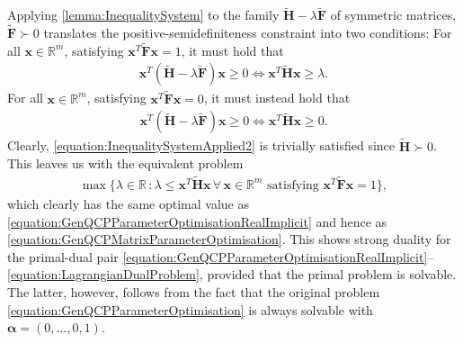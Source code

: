 \documentclass[10pt,conference]{IEEEtran}
\newcommand*{\R}{\mathbb{R}}          %
\newcommand*{\transpose}{T}           %
\begin{document}
Applying \autoref{lemma:InequalitySystem} to the family $\tilde{\bm{H}} - \lambda \tilde{\bm{F}}$ of symmetric matrices, $\tilde{\bm{F}} \succ 0$ translates the positive-semidefiniteness constraint into two conditions:
For all $\bm{x} \in \R^{m}$, satisfying $\bm{x}^{\transpose} \tilde{\bm{F}} \bm{x} = 1$, it must hold that
\begin{align}\label{equation:InequalitySystemApplied1}
    \bm{x}^{\transpose} (\tilde{\bm{H}} - \lambda \tilde{\bm{F}}) \bm{x} \geq 0 \iff \bm{x}^{\transpose} \tilde{\bm{H}} \bm{x} \geq \lambda.
\end{align}
For all $\bm{x} \in \R^{m}$, satisfying $\bm{x}^{\transpose} \tilde{\bm{F}} \bm{x} = 0$, it must instead hold that
\begin{align}\label{equation:InequalitySystemApplied2}
    \bm{x}^{\transpose} (\tilde{\bm{H}} - \lambda \tilde{\bm{F}}) \bm{x} \geq 0 \Leftrightarrow \bm{x}^{\transpose} \tilde{\bm{H}} \bm{x} \geq 0.
\end{align}
Clearly, \eqref{equation:InequalitySystemApplied2} is trivially satisfied since $\tilde{\bm{H}} \succ 0$.
This leaves us with the equivalent problem
\begin{align*}
    \max\{\lambda \in \R\, \colon \lambda \leq \bm{x}^{\transpose} \tilde{\bm{H}} \bm{x}\, \forall\, \bm{x} \in \R^{m} \text{ satisfying } \bm{x}^{\transpose} \tilde{\bm{F}} \bm{x} = 1\},
\end{align*}
which clearly has the same optimal value as \eqref{equation:GenQCPParameterOptimisationRealImplicit} and hence as \eqref{equation:GenQCPMatrixParameterOptimisation}.
This shows strong duality for the primal-dual pair \eqref{equation:GenQCPParameterOptimisationRealImplicit}--\eqref{equation:LagrangianDualProblem}, provided that the primal problem is solvable.
The latter, however, follows from the fact that the original problem \eqref{equation:GenQCPParameterOptimisation} is always solvable with $\bm{\alpha} = (0, \ldots, 0, 1)$.
\end{document}
